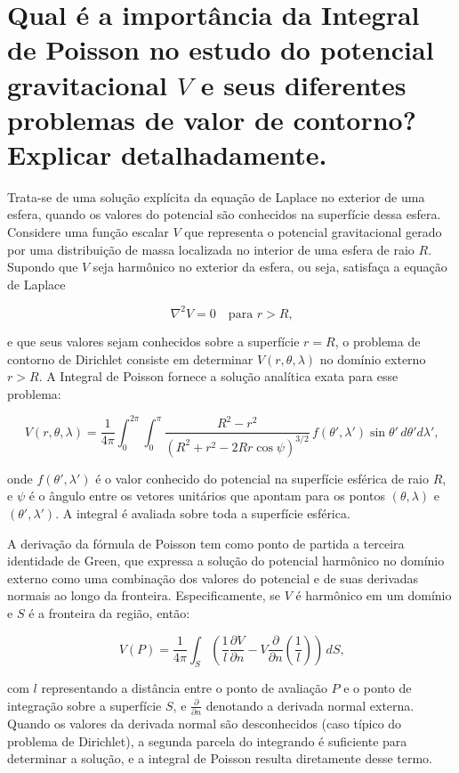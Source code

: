 \section{Qual é a importância da Integral de Poisson no estudo do potencial gravitacional $V$ e seus diferentes problemas de valor de contorno? Explicar detalhadamente.}

Trata-se de uma solução explícita da equação de Laplace no exterior de uma esfera, quando os valores do potencial são conhecidos na superfície dessa esfera. Considere uma função escalar \( V \) que representa o potencial gravitacional gerado por uma distribuição de massa localizada no interior de uma esfera de raio \( R \). Supondo que \( V \) seja harmônico no exterior da esfera, ou seja, satisfaça a equação de Laplace

\[
\nabla^2 V = 0 \quad \text{para } r > R \text{,}
\]

\noindent
e que seus valores sejam conhecidos sobre a superfície \( r = R \), o problema de contorno de Dirichlet consiste em determinar \( V(r, \theta, \lambda) \) no domínio externo \( r > R \). A Integral de Poisson fornece a solução analítica exata para esse problema:

\[
V(r, \theta, \lambda) = \frac{1}{4\pi} \int_0^{2\pi} \int_0^\pi \frac{R^2 - r^2}{(R^2 + r^2 - 2Rr \cos \psi)^{3/2}} \, f(\theta', \lambda') \sin \theta' \, d\theta' d\lambda' \text{,}
\]

\noindent
onde \( f(\theta', \lambda') \) é o valor conhecido do potencial na superfície esférica de raio \( R \), e \( \psi \) é o ângulo entre os vetores unitários que apontam para os pontos \( (\theta, \lambda) \) e \( (\theta', \lambda') \). A integral é avaliada sobre toda a superfície esférica.

A derivação da fórmula de Poisson tem como ponto de partida a terceira identidade de Green, que expressa a solução do potencial harmônico no domínio externo como uma combinação dos valores do potencial e de suas derivadas normais ao longo da fronteira. Especificamente, se \( V \) é harmônico em um domínio e \( S \) é a fronteira da região, então:

\[
V(P) = \frac{1}{4\pi} \int_S \left( \frac{1}{l} \frac{\partial V}{\partial n} - V \frac{\partial}{\partial n} \left( \frac{1}{l} \right) \right) \, dS \text{,}
\]

\noindent
com \( l \) representando a distância entre o ponto de avaliação \( P \) e o ponto de integração sobre a superfície \( S \), e \( \frac{\partial}{\partial n} \) denotando a derivada normal externa. Quando os valores da derivada normal são desconhecidos (caso típico do problema de Dirichlet), a segunda parcela do integrando é suficiente para determinar a solução, e a integral de Poisson resulta diretamente desse termo.

